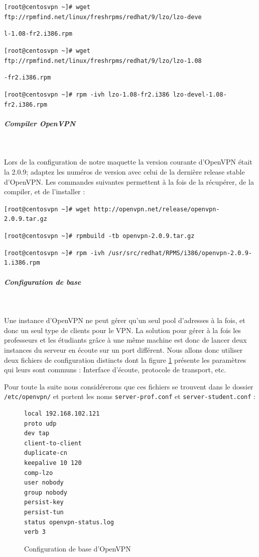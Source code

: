 \verb|[root@centosvpn ~]# wget ftp://rpmfind.net/linux/freshrpms/redhat/9/lzo/lzo-deve|

\verb|l-1.08-fr2.i386.rpm|

\verb|[root@centosvpn ~]# wget ftp://rpmfind.net/linux/freshrpms/redhat/9/lzo/lzo-1.08|

\verb|-fr2.i386.rpm|

\verb|[root@centosvpn ~]# rpm -ivh lzo-1.08-fr2.i386 lzo-devel-1.08-fr2.i386.rpm|

\subparagraph{Compiler OpenVPN}
~

Lors de la configuration de notre maquette la version courante d'OpenVPN était la 2.0.9; adaptez les numéros de version avec celui de la dernière release stable d'OpenVPN. Les commandes suivantes permettent à la fois de la récupérer, de la compiler, et de l'installer :

\verb|[root@centosvpn ~]# wget http://openvpn.net/release/openvpn-2.0.9.tar.gz|

\verb|[root@centosvpn ~]# rpmbuild -tb openvpn-2.0.9.tar.gz|

\verb|[root@centosvpn ~]# rpm -ivh /usr/src/redhat/RPMS/i386/openvpn-2.0.9-1.i386.rpm|

\subparagraph{Configuration de base}
~

Une instance d'OpenVPN ne peut gérer qu'un seul pool d'adresses à la fois, et donc un seul type de clients pour le VPN. La solution pour gérer à la fois les professeurs et les étudiants grâce à une même machine est donc de lancer deux instances du serveur en écoute sur un port différent. Nous allons donc utiliser deux fichiers de configuration distincts dont la figure \ref{configuration_base_openvpn} présente les paramètres qui leurs sont communs : Interface d'écoute, protocole de transport, etc.

Pour toute la suite nous considérerons que ces fichiers se trouvent dans le dossier \texttt{/etc/openvpn/} et portent les noms \texttt{server-prof.conf} et \texttt{server-student.conf} :

\begin{figure}[H]
	\begin{center}
		\begin{minipage}{0.90\textwidth}
			\begin{lstlisting}[frame=trBL]
local 192.168.102.121
proto udp
dev tap
client-to-client
duplicate-cn
keepalive 10 120
comp-lzo
user nobody
group nobody
persist-key
persist-tun
status openvpn-status.log
verb 3
			\end{lstlisting}
		\end{minipage}
	\end{center}
	\caption{Configuration de base d'OpenVPN}
	\label{configuration_base_openvpn}
\end{figure}

